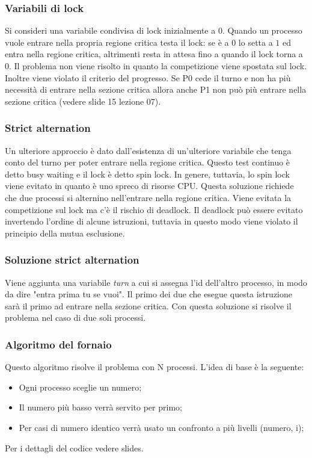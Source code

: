 \subsubsection{Variabili di lock}
Si consideri una variabile condivisa di lock inizialmente a $0$. Quando un processo vuole entrare nella propria regione critica testa il lock: se è a $0$ lo setta a $1$ ed entra nella
regione critica, altrimenti resta in attesa fino a quando il lock torna a $0$. Il problema non viene risolto in quanto la competizione viene spostata sul lock.
Inoltre viene violato il criterio del progresso. Se P0 cede il turno e non ha più necessità di entrare nella sezione critica allora anche P1 non può più entrare nella sezione critica (vedere slide 15 lezione 07).

\subsubsection{Strict alternation}
Un ulteriore approccio è dato dall'esistenza di un'ulteriore variabile che tenga conto del turno per poter entrare nella regione critica. Questo test continuo è detto busy waiting e il
lock è detto spin lock. In genere, tuttavia, lo spin lock viene evitato in quanto è uno spreco di risorse CPU. Questa soluzione richiede che due processi si alternino nell'entrare nella regione critica.
Viene evitata la competizione sul lock ma c'è il rischio di deadlock. Il deadlock può essere evitato invertendo l'ordine di alcune istruzioni, tuttavia in questo modo viene violato il principio della mutua esclusione.

\subsubsection{Soluzione strict alternation}
Viene aggiunta una variabile \emph{turn} a cui si assegna l'id dell'altro processo, in modo da dire "entra prima tu se vuoi". Il primo dei due che esegue questa istruzione sarà il primo ad entrare nella sezione critica. Con questa soluzione si risolve il problema nel caso di due soli processi.

\subsubsection{Algoritmo del fornaio}
Questo algoritmo risolve il problema con N processi. L'idea di base è la seguente:
\begin{itemize}
	\item Ogni processo sceglie un numero;
	\item Il numero più basso verrà servito per primo;
	\item Per casi di numero identico verrà usato un confronto a più livelli (numero, i);
\end{itemize}
Per i dettagli del codice vedere slides.

